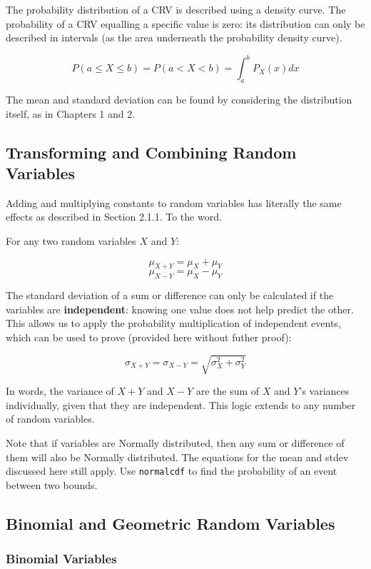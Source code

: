 \documentclass[12pt, a4paper]{article}
\theoremstyle{definition}
\begin{document}
The probability distribution of a CRV is described using a density curve.
The probability of a CRV equalling a specific value is zero: its distribution can only be described in intervals (as the area underneath the probability density curve).

\[P(a \leq X \leq b) = P(a < X < b) = \int_{a}^{b} P_{X}(x)dx\]

The mean and standard deviation can be found by considering the distribution itself, as in Chapters 1 and 2.

\subsection{Transforming and Combining Random Variables}

Adding and multiplying constants to random variables has literally the same effects as described in Section 2.1.1. To the word.

For any two random variables $X$ and $Y$:

\[\mu_{X + Y} = \mu_X + \mu_Y\]
\[\mu_{X - Y} = \mu_X - \mu_Y\]

The standard deviation of a sum or difference can only be calculated if the variables are \textbf{independent}: knowing one value does not help predict the other.
This allows us to apply the probability multiplication of independent events, which can be used to prove (provided here without futher proof):

\[\sigma_{X + Y} = \sigma_{X - Y} = \sqrt{\sigma_X^2 + \sigma_Y ^2}\]

In words, the variance of $X + Y$ and $X - Y$ are the sum of $X$ and $Y$'s variances individually, given that they are independent.
This logic extends to any number of random variables.

Note that if variables are Normally distributed, then any sum or difference of them will also be Normally distributed.
The equations for the mean and stdev discussed here still apply.
Use \verb|normalcdf| to find the probability of an event between two bounds.

\subsection{Binomial and Geometric Random Variables}

\subsubsection{Binomial Variables}
\end{document}
